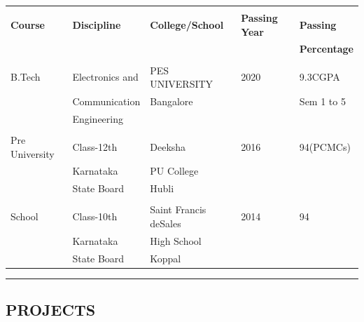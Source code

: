 \documentclass[10pt,letterpaper]{article}
\begin{document}
\begin{tabular}{ |p{3cm}|p{3cm}|p{3.5cm}|p{2cm}|p{2cm}| }

 \hline
 &&&&\\ \textbf{ Course} & \textbf{Discipline} & \textbf{College/School}& \textbf{Passing Year} &  \textbf{Passing}\\
&&&&\textbf{Percentage}\\

 \hline
&&&&\\B.Tech &  Electronics and  &        PES UNIVERSITY &       2020 &         9.3CGPA\\
&Communication&Bangalore&&Sem 1 to 5\\
&Engineering&&&\\

 \hline
&&&&\\Pre University &Class-12th &Deeksha& 2016 & 94(PCMCs)\\
&Karnataka &PU College&&\\
&State Board&Hubli&&\\

\hline
&&&&\\School&Class-10th&Saint Francis deSales &2014&94\\
&Karnataka& High School&&\\
&State Board&Koppal&&\\

\hline
\end{tabular}


\pagebreak

\hrule
\subsection*{PROJECTS}
\end{document}
